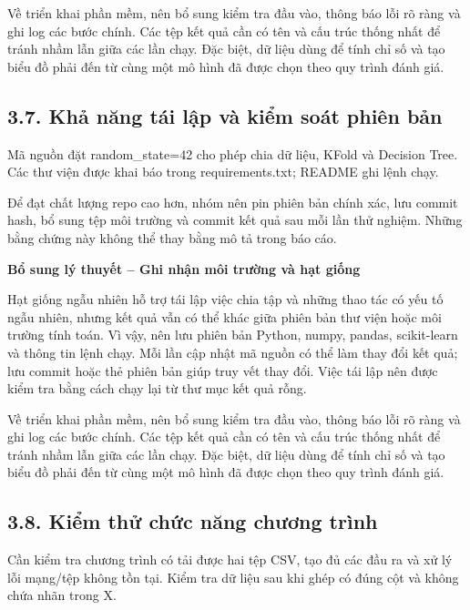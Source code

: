 \documentclass[12pt,a4paper,oneside]{article}
\begin{document}
Về triển khai phần mềm, nên bổ sung kiểm tra đầu vào, thông báo lỗi rõ ràng và ghi log các bước chính. Các tệp kết quả cần có tên và cấu trúc thống nhất để tránh nhầm lẫn giữa các lần chạy. Đặc biệt, dữ liệu dùng để tính chỉ số và tạo biểu đồ phải đến từ cùng một mô hình đã được chọn theo quy trình đánh giá.\par

\subsection*{3.7. Khả năng tái lập và kiểm soát phiên bản}

Mã nguồn đặt random\_state=42 cho phép chia dữ liệu, KFold và Decision
Tree. Các thư viện được khai báo trong requirements.txt; README ghi lệnh
chạy.

Để đạt chất lượng repo cao hơn, nhóm nên pin phiên bản chính xác, lưu
commit hash, bổ sung tệp môi trường và commit kết quả sau mỗi lần thử
nghiệm. Những bằng chứng này không thể thay bằng mô tả trong báo cáo.


\par\noindent\textbf{Bổ sung lý thuyết -- Ghi nhận môi trường và hạt giống}\par
Hạt giống ngẫu nhiên hỗ trợ tái lập việc chia tập và những thao tác có yếu tố ngẫu nhiên, nhưng kết quả vẫn có thể khác giữa phiên bản thư viện hoặc môi trường tính toán. Vì vậy, nên lưu phiên bản Python, numpy, pandas, scikit-learn và thông tin lệnh chạy. Mỗi lần cập nhật mã nguồn có thể làm thay đổi kết quả; lưu commit hoặc thẻ phiên bản giúp truy vết thay đổi. Việc tái lập nên được kiểm tra bằng cách chạy lại từ thư mục kết quả rỗng.\par

Về triển khai phần mềm, nên bổ sung kiểm tra đầu vào, thông báo lỗi rõ ràng và ghi log các bước chính. Các tệp kết quả cần có tên và cấu trúc thống nhất để tránh nhầm lẫn giữa các lần chạy. Đặc biệt, dữ liệu dùng để tính chỉ số và tạo biểu đồ phải đến từ cùng một mô hình đã được chọn theo quy trình đánh giá.\par

\subsection*{3.8. Kiểm thử chức năng chương trình}

Cần kiểm tra chương trình có tải được hai tệp CSV, tạo đủ các đầu ra và
xử lý lỗi mạng/tệp không tồn tại. Kiểm tra dữ liệu sau khi ghép có đúng
cột và không chứa nhãn trong X.
\end{document}
